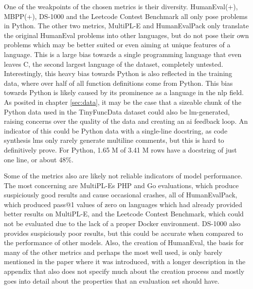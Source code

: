 One of the weakpoints of the chosen metrics is their diversity.
HumanEval(+), MBPP(+), DS-1000 and the Leetcode Contest Benchmark all only pose problems in Python.
The other two metrics, MultiPL-E and HumanEvalPack only translate the original HumanEval problems into other languages, but do not pose their own problems which may be better suited or even aiming at unique features of a language.
This is a large bias towards a single programming language that even leaves C, the second largest language of the dataset, completely untested.
Interestingly, this heavy bias towards Python is also reflected in the training data, where over half of all function definitions come from Python.
This bias towards Python is likely caused by its prominence as a language in the \ac{nlp} field.
As posited in chapter \ref{sec:data}, it may be the case that a sizeable chunk of the Python data used in the TinyFuncData dataset could also be \ac{lm}-generated, raising concerns over the quality of the data and creating an \ac{ai} feedback loop.
An indicator of this could be Python data with a single-line docstring, as code synthesis \acp{lm} only rarely generate multiline comments, but this is hard to definitively prove.
For Python, 1.65 M of 3.41 M rows have a docstring of just one line, or about 48\%.

\begin{comment}
The entire distribution of docstring line counts and length is shown in figure \ref{fig:docdist}.
\begin{figure}[h]
    \centering
    \begin{minipage}{0.5\textwidth}
        \centering
        \texttt{[image: kapitel6/docline.png]}
    \end{minipage}\hfill
    \begin{minipage}{0.5\textwidth}
        \centering
        \texttt{[image: kapitel6/doclen.png]}
    \end{minipage}
    \caption{Distribution of the number of docstring lines and docstring length in TinyFuncData-Python.}
    \label{fig:docdist}
\end{figure}
\end{comment}

Some of the metrics also are likely not reliable indicators of model performance.
The most concerning are MultiPL-Es PHP and Go evaluations, which produce suspiciously good results and cause occasional crashes, all of HumanEvalPack, which produced pass@1 values of zero on languages which had already provided better results on MultiPL-E, and the Leetcode Contest Benchmark, which could not be evaluated due to the lack of a proper Docker environment.
DS-1000 also provides suspiciously poor results, but this could be accurate when compared to the performance of other models.
Also, the creation of HumanEval, the basis for many of the other metrics and perhaps the most well used, is only barely mentioned in the paper where it was introduced, with a longer description in the appendix that also does not specify much about the creation process and mostly goes into detail about the properties that an evaluation set should have.

